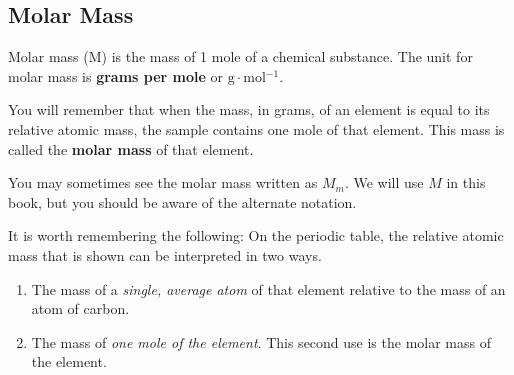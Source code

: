             \subsection*{Molar Mass}
            \nopagebreak
\par
            \label{m38717*fhsst!!!underscore!!!id147}
 { \label{m38717*meaningfhsst!!!underscore!!!id147}
      \label{m38717*id276397}Molar mass (M) is the mass of 1 mole of a chemical substance. The unit for molar mass is \textbf{grams per mole} or $\mathrm{g}\ensuremath{\cdot}\mathrm{mol}{}^{-1}$. \par 
       } 
      \label{m38717*id276429}You will remember that when the mass, in grams, of an element is equal to its relative atomic mass, the sample contains one mole of that element. This mass is called the \textbf{molar mass} of that element.\par 
      \label{m38717*eip-277}You may sometimes see the molar mass written as ${M}_{m}$. We will use $M$ in this book, but you should be aware of the alternate notation.\par \label{m38717*id276445}It is worth remembering the following: On the periodic table, the relative atomic mass that is shown can be interpreted in two ways.\par 
      \label{m38717*id276451}\begin{enumerate}[noitemsep, label=\textbf{\arabic*}. ] 
            \label{m38717*uid9}\item The mass of a \textsl{single, average atom} of that element relative to the mass of an atom of carbon.
\label{m38717*uid10}\item The mass of \textsl{one mole of the element}. This second use is the molar mass of the element.
\end{enumerate}
